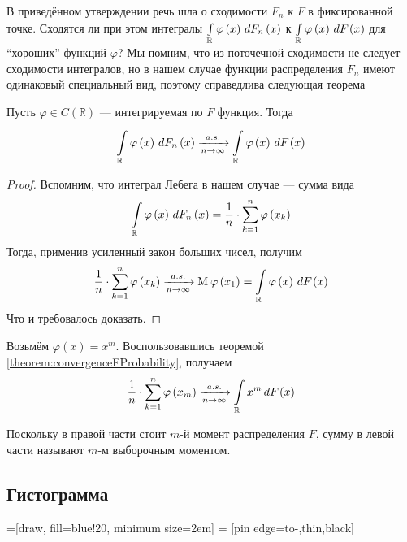 В приведённом утверждении речь шла о сходимости $F_n$ к $F$ в фиксированной
точке. Сходятся ли при этом интегралы
$\integrall{\mathbb{R}}{d\cdfn{x}}{\varphi\left( x \right)}$
к
$\integrall{\mathbb{R}}{d\cdf{x}}{\varphi\left( x \right)}$
для ``хороших'' функций $\varphi$?
Мы помним, что из поточечной сходимости не следует сходимости интегралов, но в
нашем случае функции распределения $F_n$ имеют одинаковый специальный вид,
поэтому справедлива следующая теорема
\begin{theorem}
  \label{theorem:convergenceFProbability}
  Пусть $\varphi \in C\left( \mathbb{R} \right)$ --- интегрируемая по $F$
  функция. Тогда
  \begin{equation*}
    \integrall{\mathbb{R}}{d\cdfn{x}}{\varphi\left( x \right)}
    \acovergence
    \integrall{\mathbb{R}}{d\cdf{x}}{\varphi\left( x \right)}
  \end{equation*}
\end{theorem}
\begin{proof}
  Вспомним, что интеграл Лебега в нашем случае --- сумма вида
  \begin{equation*}
    \integrall{\mathbb{R}}{d\cdfn{x}}{\varphi\left( x \right)}
    = \frac{1}{n} \cdot \sum_{k=1}^{n}\varphi\left( x_k \right)
  \end{equation*}
  Тогда, применив усиленный закон больших чисел, получим
  \begin{equation*}
    \frac{1}{n} \cdot \sum_{k=1}^{n}\varphi\left( x_k \right)
    \acovergence
    \mean{\varphi\left( x_1 \right)}
    = \integrall{\mathbb{R}}{d\cdf{x}}{\varphi\left( x \right)}
  \end{equation*}
  Что и требовалось доказать.
\end{proof}

\begin{example}
  Возьмём $\varphi\left( x \right) = x^m$. Воспользовавшись теоремой
  \ref{theorem:convergenceFProbability}, получаем
  \begin{equation*}
    \frac{1}{n} \cdot \sum_{k=1}^{n}\varphi\left( x_m \right)
    \acovergence
    \integrall{\mathbb{R}}{d\cdf{x}}{x^m}
  \end{equation*}

  Поскольку в правой части стоит $m$-й момент распределения $F$, сумму в левой
  части называют $m$-м выборочным моментом.
\end{example}

\subsection{Гистограмма}
\label{subsection:histogram}
=[draw, fill=blue!20, minimum size=2em]
 = [pin edge={to-,thin,black}]

